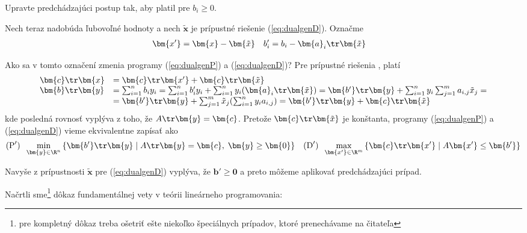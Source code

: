 \begin{prob}
  Upravte predchádzajúci postup tak, aby platil pre $b_i\ge0$.
\end{prob}

\noindent
Nech teraz  nadobúda ľubovoľné hodnoty a nech $\bm{\tilde{x}}$ je prípustné riešenie (\ref{eq:dualgenD}).
Označme 
\begin{align}
  \label{eq:dualgen5}
  \bm{x'}&=\bm{x}-\bm{\tilde{x}} & b_i'&=b_i-\bm{a}_i\tr\bm{\tilde{x}}
\end{align}

\noindent
Ako sa v tomto označení zmenia programy (\ref{eq:dualgenP}) a (\ref{eq:dualgenD})?
Pre prípustné riešenia ,  platí
$$
\begin{array}{ll}
  \bm{c}\tr\bm{x} &= \bm{c}\tr\bm{x'} + \bm{c}\tr\bm{\tilde{x}}\\
  \bm{b}\tr\bm{y} &= \sum_{i=1}^nb_iy_i = \sum_{i=1}^nb'_iy_i+\sum_{i=1}^ny_i(\bm{a}_i\tr\bm{\tilde{x}})=
  \bm{b'}\tr\bm{y}+\sum_{i=1}^ny_i\sum_{j=1}^ma_{i,j}\tilde{x}_j =\\
  &= \bm{b'}\tr\bm{y}+ \sum_{j=1}^m\tilde{x}_j(\sum_{i=1}^ny_ia_{i,j}) =
  \bm{b'}\tr\bm{y}+\bm{c}\tr\bm{\tilde{x}}
\end{array}
$$
kde posledná rovnosť vyplýva z toho, že $A\tr\bm{y}=\bm{c}$. 
Pretože $\bm{c}\tr\bm{\tilde{x}}$ je konštanta, programy  (\ref{eq:dualgenP}) a (\ref{eq:dualgenD}) vieme 
ekvivalentne zapísať ako
\begin{align*}
  (\text{P}')\;\; \min_{\bm{y}\in\R^n}\left\{ \bm{b'}\tr\bm{y} \mid A\tr\bm{y}=\bm{c},\;\bm{y}\ge\bm{0}\right\}
  &&
 (\text{D}')\;\; \max_{\bm{x'}\in\R^m}\left\{ \bm{c}\tr\bm{x'} \mid A\bm{x'}\le\bm{b'}\right\}
\end{align*}

\noindent
Navyše z prípustnosti $\bm{\tilde{x}}$ pre (\ref{eq:dualgenD}) vyplýva, že $\bm{b'}\ge\bm{0}$ a preto
môžeme aplikovať predchádzajúci prípad.

\noindent
Načrtli sme\footnote{pre kompletný dôkaz treba ošetriť ešte niekoľko 
špeciálnych prípadov, ktoré prenechávame na čitateľa} dôkaz fundamentálnej vety v teórii lineárneho programovania:

